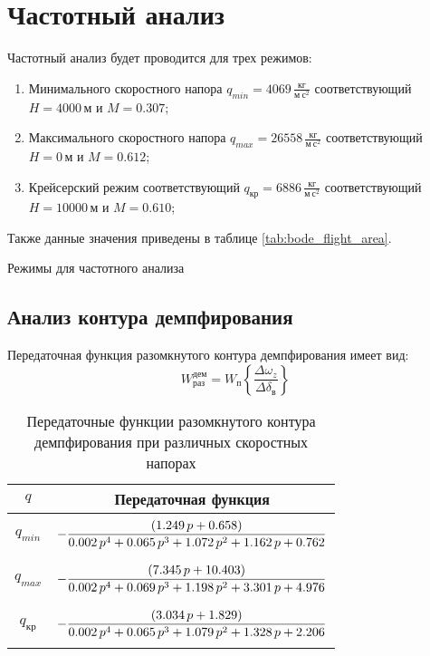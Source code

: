 \section{Частотный анализ}

Частотный анализ будет проводится для трех режимов:
\begin{enumerate}
    \item Минимального скоростного напора $q_{min}=4069\, \frac{кг}{м\ с^2}$ соответствующий $H=4000\, м$ и $M = 0.307$;
    \item Максимального скоростного напора $q_{max}= 26558\, \frac{кг}{м\ с^2}$ соответствующий $H = 0\, м$ и $M = 0.612$;
    \item Крейсерский режим соответствующий $q_{кр} = 6886\, \frac{кг}{м\ с^2}$ соответствующий $H = 10000\, м$ и $M = 0.610$;
\end{enumerate}
Также данные значения приведены в таблице \ref{tab:bode_flight_area}.

\begin{table}[H]
    \centering
    \caption{Режимы для частотного анализа}
    \label{tab:bode_flight_area}
    
\end{table}

\subsection{Анализ контура демпфирования}
Передаточная функция разомкнутого контура демпфирования имеет вид:
\begin{equation}
    W_{раз}^{дем} = W_{п} \left\{\frac{\Delta \omega_z}{\Delta \delta_\text{в}} \right\}
\end{equation}

\begin{table}[H]
    \centering
    \caption{Передаточные функции разомкнутого контура демпфирования при различных скоростных напорах}
    \label{tab:demp_ol}
    \begin{tabular}{|c|c|}
    \hline 
    $q$ & Передаточная функция\\ 
    \hline
    $q_{min}$& $\displaystyle -\frac{\left(1.249\,p+0.658\right)}{0.002\,p^4+0.065\,p^3+1.072\,p^2+1.162\,p+0.762}\addstrut{3em}$\\ 
    \hline
    $q_{max}$& $\displaystyle -\frac{\left(7.345\,p+10.403\right)}{0.002\,p^4+0.069\,p^3+1.198\,p^2+3.301\,p+4.976}\addstrut{3em}$\\
    \hline
    $q_{кр}$ & $\displaystyle -\frac{\left(3.034\,p+1.829\right)}{0.002\,p^4+0.065\,p^3+1.079\,p^2+1.328\,p+2.206}\addstrut{3em}$ \\
    \hline
    \end{tabular}
\end{table}

